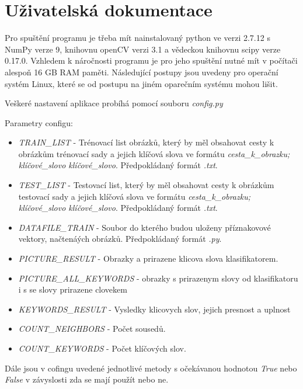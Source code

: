 \documentclass[czech,BP]{thesiskiv}
\begin{document}

{\raggedright\small

}

\appendix
\chapter{Uživatelská dokumentace}
\par Pro spuštění programu je třeba mít nainstalovaný python ve verzi 2.7.12 s NumPy verze 9, knihovnu openCV verzi 3.1 a vědeckou knihovnu scipy verze 0.17.0. Vzhledem k náročnosti programu je pro jeho spuštění nutné mít v počítači alespoň 16 GB RAM paměti. Následující postupy jsou uvedeny pro operační systém Linux, které se od postupu na jiném oparečním systému mohou lišit.

\par Veškeré nastavení aplikace probíhá pomocí souboru \textit{config.py}

\vspace{1cm} 
Parametry configu:
\begin{itemize}
	\item \textit{TRAIN\_LIST} - Trénovací list obrázků, který by měl obsahovat cesty k obrázkům trénovací sady a jejich klíčová slova ve formátu \textit{cesta\_k\_obrazku; klíčové\_slovo klíčové\_slovo}. Předpokládaný formát \textit{.txt}.
	\item \textit{TEST\_LIST} - Testovací list, který by měl obsahovat cesty k obrázkům testovací sady a jejich klíčová slova ve formátu \textit{cesta\_k\_obrazku; klíčové\_slovo klíčové\_slovo}. Předpokládaný formát \textit{.txt}.
	\item \textit{DATAFILE\_TRAIN} - Soubor do kterého budou uloženy příznakovové vektory, načtenáých obrázků. Předpokládaný formát \textit{.py}.
	\item \textit{PICTURE\_RESULT} - Obrazky a prirazene klicova slova klasifikatorem.
	\item \textit{PICTURE\_ALL\_KEYWORDS} - obrazky s prirazenym slovy od klasifikatoru i s se slovy prirazene clovekem
	\item \textit{KEYWORDS\_RESULT} - Vysledky klicovych slov, jejich presnost a uplnost
	\item \textit{COUNT\_NEIGHBORS} - Počet sousedů.
	\item \textit{COUNT\_KEYWORDS} - Počet klíčových slov.
\end{itemize}
Dále jsou v cofingu uvedené jednotlivé metody s očekávanou hodnotou \textit{True} nebo \textit{False} v závyslosti zda se mají použít nebo ne.
\end{document}
